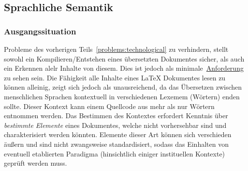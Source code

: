 


\subsection{Sprachliche Semantik}\label{problems:linguistical}
\subsubsection{Ausgangssituation}
Probleme des vorherigen Teils~\ref{problems:technological} zu verhindern, stellt sowohl ein Kompilieren/Entstehen eines übersetzten Dokumentes sicher, als auch ein Erkennen alelr Inhalte von diesem. Dies ist jedoch als minimale~\hyperref[technologies:demands]{Anforderung} zu sehen sein. Die Fähigkeit alle Inhalte eines \LaTeX{} Dokumentes lesen zu können alleinig, zeigt sich jedoch als unausreichend, da das Übersetzen zwischen menschlichen Sprachen kontextuell in verschiedenen Lexemem (Wörtern) enden sollte.%
Dieser Kontext kann einem Quellcode aus mehr als nur Wörtern entnommen werden. Das Bestimmen des Kontextes erfordert Kenntnis über \textit{bestimmte Elemente} eines Dokumentes, welche nicht vorhersehbar sind und charakterisiert werden könnten. Elemente dieser Art können sich verschieden äußern und sind nicht zwangsweise standardisiert, sodass das Einhalten von eventuell etablierten Paradigma (hinsichtlich einiger instituellen Kontexte) geprüft werden muss. 


